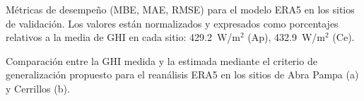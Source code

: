 \documentclass[letterpaper,12pt, twoside]{report}
\providecommand{\DIFdeltex}[1]{{\protect\color{red} \scriptsize #1}} %
\providecommand{\DIFdelFL}[1]{\DIFdel{#1}} %
\providecommand{\DIFdel}[1]{\texorpdfstring{\DIFdeltex{#1}}{}} %
\begin{document}
{%
\DIFdelFL{Métricas de desempeño (MBE, MAE, RMSE) para el modelo ERA5 en los sitios de validación. Los valores están normalizados y expresados como porcentajes relativos a la media de GHI en cada sitio: 429.2~W/m$^2$ (Ap), 432.9~W/m$^2$ (Ce).}}

{%
}
{%
}
{%
\DIFdelFL{Comparación entre la GHI medida y la estimada mediante el criterio de generalización propuesto para el reanálisis ERA5 en los sitios de Abra Pampa (a) y Cerrillos (b).}}
\end{document}
